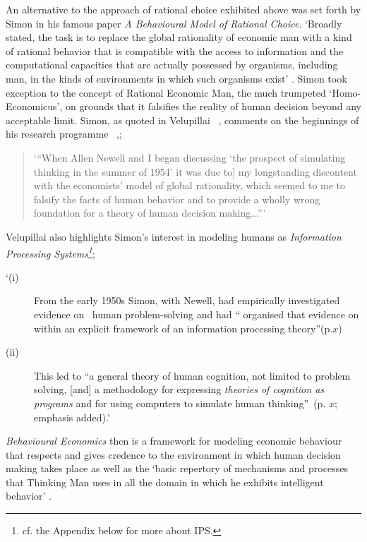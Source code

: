 \documentclass{ucthesis}
\begin{document}
An alternative to the approach of rational choice exhibited above was set
forth by Simon \cite[1955]{Simon BMRC} in his famous paper \textit{A
Behavioural Model of Rational Choice}. `Broadly stated, the task is to
replace the global rationality of economic man with a kind of rational
behavior that is compatible with the access to information and the
computational capacities that are actually possessed by organisms, including
man, in the kinds of environments in which such organisms exist' \cite[pp. 99%
]{Simon BMRC}. Simon took exception to the concept of Rational Economic Man,
the much trumpeted `Homo-Economicus', on grounds that it falsifies the
reality of human decision beyond any acceptable limit. Simon, as quoted in
Velupillai \ \cite[2000]{Vela 2000}, comments on the beginnings of his
research programme \ \cite[all quotes are originally from Simon, 1979:
ix-xiii and 3-5 ]{Vela 2000},;

\begin{quotation}
`\textquotedblleft \lbrack When Allen Newell and I began discussing `the
prospect of simulating thinking in the summer of 1954' it was due to] my
longstanding discontent with the economists' model of global rationality,
which seemed to me to falsify the facts of human behavior and to provide a
wholly wrong foundation for a theory of human decision
making...\textquotedblright '\cite[pp. 23, (a)]{Vela 2000}
\end{quotation}

Velupillai also highlights Simon's interest in modeling humans as \textit{%
Information Processing Systems\footnote{%
cf. the Appendix below for more about IPS.}};

\begin{description}
\item[`(i)] From the early 1950s Simon, with Newell, had empirically
investigated evidence on \ human problem-solving and had \textquotedblleft
organised that evidence on within an explicit framework of an information
processing theory\textquotedblright (p.$x$)

\item[(ii)] This led to \textquotedblleft a general theory of human
cognition, not limited to problem solving, [and] a methodology for
expressing \textit{theories of cognition as programs} and for using
computers to simulate human thinking\textquotedblright\ (p. $x$; emphasis
added).'\cite[pp. 24]{Vela 2000}
\end{description}

\textit{Behavioural Economics} then is a framework for modeling economic
behaviour that respects and gives credence to the environment in which human
decision making takes place as well as the `basic repertory of mechanisms
and processes that Thinking Man uses in all the domain in which he exhibits
intelligent behavior' \cite[Velupillai quoting Simon, pp. 25, originally in
Simon, 1979, p. $x$]{Vela 2000}.
\end{document}
